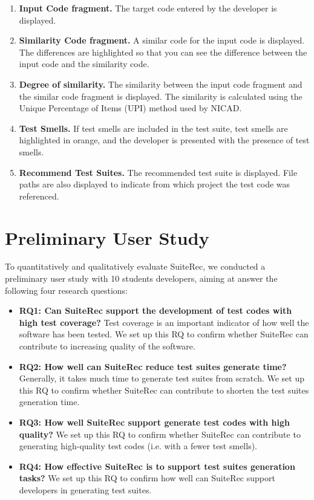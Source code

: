 \documentclass[conference]{IEEEtran}
\begin{document}
 \begin{enumerate}
\renewcommand{\labelenumi}{(\arabic{enumi})}
\item{\textbf{Input Code fragment. }The target code entered by the developer is displayed.}
\item{\textbf{Similarity Code fragment. }A similar code for the input code is displayed. The differences are highlighted so that you can see the difference between the input code and the similarity code.}
\item{\textbf{Degree of similarity. }The similarity between the input code fragment and the similar code fragment is displayed. The similarity is calculated using the Unique Percentage of Items (UPI) method used by NICAD. }
\item{\textbf{Test Smells. }If test smells are included in the test suite, test smells are highlighted in orange, and the developer is presented with the presence of test smells. }
\item{\textbf{Recommend Test Suites. }The recommended test suite is displayed. File paths are also displayed to indicate from which project the test code was referenced. }
\end{enumerate}


\section{ Preliminary User Study}
To quantitatively and qualitatively evaluate SuiteRec, we conducted a preliminary user study with 10 students developers,  aiming at answer the following four research questions:

\begin{itemize}
\item \textbf{RQ1: Can SuiteRec support the development of test codes with high test coverage?}  Test coverage is an important indicator of how well the software has been tested. We set up this RQ to confirm whether  SuiteRec can contribute to increasing  quality of the software.
\item  \textbf{RQ2: How well can SuiteRec reduce test suites  generate time?} Generally, it takes much time to generate test suites from scratch. We set up this RQ to confirm whether  SuiteRec  can  contribute to shorten the test suites generation time.
\item \textbf{RQ3: How well  SuiteRec support generate test codes with high quality?} We set up this RQ to confirm whether SuiteRec can contribute to generating high-quality test codes (i.e. with a fewer test smells).
\item \textbf{RQ4: How effective SuiteRec is to support test suites generation tasks?} We set up this RQ to confirm how well can SuiteRec support developers in generating test  suites.
\end{itemize}
\end{document}
